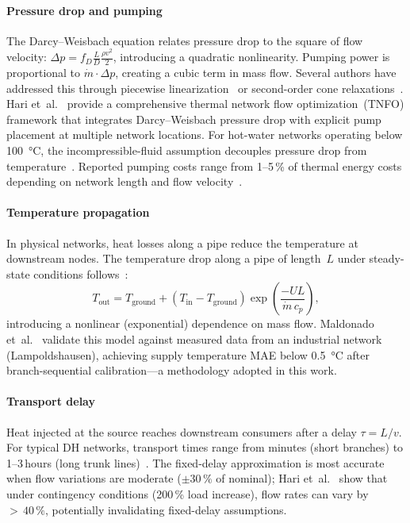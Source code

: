 \documentclass[review,3p]{elsarticle}
\begin{document}
\paragraph{Pressure drop and pumping}
The Darcy--Weisbach equation relates pressure drop to the square of
flow velocity:
$\Delta p = f_D \frac{L}{D} \frac{\rho v^2}{2}$, introducing a
quadratic nonlinearity. Pumping power is proportional to
$\dot{m} \cdot \Delta p$, creating a cubic term in mass flow. Several
authors have addressed this through piecewise
linearization~\cite{Bordin2016,Mertz2016} or second-order cone
relaxations~\cite{Blommaert2020}. Hari et~al.~\cite{Hari2024} provide
a comprehensive thermal network flow optimization~(TNFO) framework
that integrates Darcy--Weisbach pressure drop with explicit pump
placement at multiple network locations. For hot-water networks
operating below \SI{100}{\celsius}, the incompressible-fluid
assumption decouples pressure drop from
temperature~\cite{Hari2024}. Reported pumping costs range from
1--5\,\% of thermal energy costs depending on network length and flow
velocity~\cite{Frederiksen2013}.

\paragraph{Temperature propagation}
In physical networks, heat losses along a pipe reduce the temperature
at downstream nodes. The temperature drop along a pipe of length~$L$
under steady-state conditions follows~\cite{vanderHeijde2017}:
%
\begin{equation*}
  T_{\mathrm{out}} = T_{\mathrm{ground}}
    + (T_{\mathrm{in}} - T_{\mathrm{ground}})
      \exp\!\left(\frac{-UL}{\dot{m}\,c_p}\right),
\end{equation*}
%
introducing a nonlinear (exponential) dependence on mass flow.
Maldonado et~al.~\cite{Maldonado2024} validate this model against
measured data from an industrial network (Lampoldshausen), achieving
supply temperature MAE below \SI{0.5}{\celsius} after
branch-sequential calibration---a methodology adopted in this work.

\paragraph{Transport delay}
Heat injected at the source reaches downstream consumers after a
delay $\tau = L/v$. For typical DH networks, transport times range
from minutes (short branches) to 1--3\,hours (long trunk
lines)~\cite{vanderHeijde2017,Giraud2015}. The fixed-delay
approximation is most accurate when flow variations are moderate
($\pm 30\,\%$ of nominal); Hari et~al.~\cite{Hari2024} show that
under contingency conditions (200\,\% load increase), flow rates can
vary by ${>}\,40\,\%$, potentially invalidating fixed-delay
assumptions.
\end{document}
